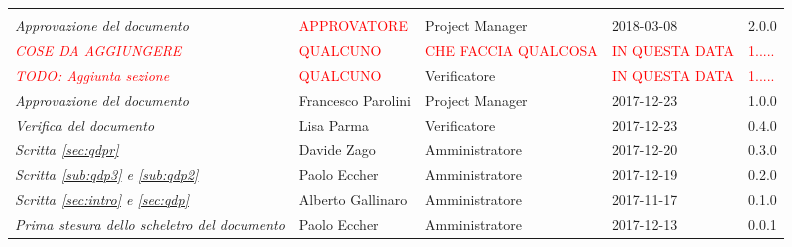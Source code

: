 \newpage 
\section*{}
\begin{table}[H]
	\centering
	\begin{tabular}{p{4cm}|C{3cm}|C{3cm}|R{2.5cm}|R{2cm}}
		
		 & & & & \\
		

		\emph{Approvazione del documento} & \textcolor{red}{APPROVATORE} & Project Manager & 2018-03-08 & 2.0.0 \\
		\hline

		\emph{\textcolor{red}{COSE DA AGGIUNGERE}}& \textcolor{red}{QUALCUNO} & \textcolor{red}{CHE FACCIA QUALCOSA} & \textcolor{red}{IN QUESTA DATA} & \textcolor{red}{1.....} \\
		\hline

		\emph{\textcolor{red}{TODO: Aggiunta sezione }}& \textcolor{red}{QUALCUNO} & Verificatore & \textcolor{red}{IN QUESTA DATA} & \textcolor{red}{1.....} \\
		\hline

		\emph{Approvazione del documento}& Francesco Parolini & Project Manager & 2017-12-23 & 1.0.0 \\
		\hline
		
		\emph{Verifica del documento}& Lisa Parma & Verificatore & 2017-12-23 & 0.4.0 \\
		\hline
		
		\emph{Scritta \ref{sec:qdpr}}& Davide Zago & Amministratore & 2017-12-20 & 0.3.0 \\
		\hline
		
		\emph{Scritta \ref{sub:qdp3} e \ref{sub:qdp2}}& Paolo Eccher & Amministratore & 2017-12-19 & 0.2.0 \\
		\hline
		
		\emph{Scritta \ref{sec:intro} e \ref{sec:qdp}} & Alberto Gallinaro & Amministratore & 2017-11-17 & 0.1.0 \\
		\hline
		
		\emph{Prima stesura dello scheletro del documento} & Paolo Eccher & Amministratore & 2017-12-13 & 0.0.1 \\
		
	\end{tabular}
	
\end{table}


\clearpage